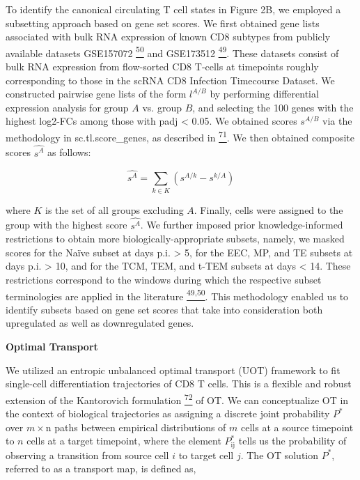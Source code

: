 To identify the canonical circulating T cell states in Figure 2B, we
employed a subsetting approach based on gene set scores. We first
obtained gene lists associated with bulk RNA expression of known CD8
subtypes from publicly available datasets GSE157072
\href{https://sciwheel.com/work/citation?ids=9725107\&pre=\&suf=\&sa=0\&dbf=0}{\textsuperscript{50}}
and GSE173512
\href{https://sciwheel.com/work/citation?ids=11131663\&pre=\&suf=\&sa=0\&dbf=0}{\textsuperscript{49}}.
These datasets consist of bulk RNA expression from flow-sorted CD8
T-cells at timepoints roughly corresponding to those in the scRNA CD8
Infection Timecourse Dataset. We constructed pairwise gene lists of the
form \(l^{A/B}\) by performing differential expression analysis for
group \(A\) vs. group \(B\), and selecting the 100 genes with the
highest log2-FCs among those with padj \textless{} 0.05. We obtained
scores \(s^{A/B}\) via the methodology in sc.tl.score\_genes, as
described in
\href{https://sciwheel.com/work/citation?ids=112055\&pre=\&suf=\&sa=0\&dbf=0}{\textsuperscript{71}}.
We then obtained composite scores \(\widehat{s^{A}}\) as follows:

\[\widehat{s^{A}} = \sum_{k \in K}^{}\left( s^{A/k} - s^{k/A} \right)\]

where \(K\) is the set of all groups excluding \(A\). Finally, cells
were assigned to the group with the highest score \(\widehat{s^{A}}\).
We further imposed prior knowledge-informed restrictions to obtain more
biologically-appropriate subsets, namely, we masked scores for the Naïve
subset at days p.i. \textgreater{} 5, for the EEC, MP, and TE subsets at
days p.i. \textgreater{} 10, and for the TCM, TEM, and t-TEM subsets at
days \textless{} 14. These restrictions correspond to the windows during
which the respective subset terminologies are applied in the literature
\href{https://sciwheel.com/work/citation?ids=9725107,11131663\&pre=\&pre=\&suf=\&suf=\&sa=0,0\&dbf=0\&dbf=0}{\textsuperscript{49,50}}.
This methodology enabled us to identify subsets based on gene set scores
that take into consideration both upregulated as well as downregulated
genes.

\textbf{Optimal Transport}

We utilized an entropic unbalanced optimal transport (UOT) framework to
fit single-cell differentiation trajectories of CD8 T cells. This is a
flexible and robust extension of the Kantorovich formulation
\href{https://sciwheel.com/work/citation?ids=7314344\&pre=\&suf=\&sa=0\&dbf=0}{\textsuperscript{72}}
of OT. We can conceptualize OT in the context of biological trajectories
as assigning a discrete joint probability \(P^{*}\) over
\(m \times \text{n\ }\)paths between empirical distributions of \(m\)
cells at a source timepoint to \(n\) cells at a target timepoint, where
the element \(P_{\text{ij}}^{*}\) tells us the probability of observing
a transition from source cell \(i\) to target cell \(j\). The OT
solution \(P^{*}\), referred to as a transport map, is defined as,


